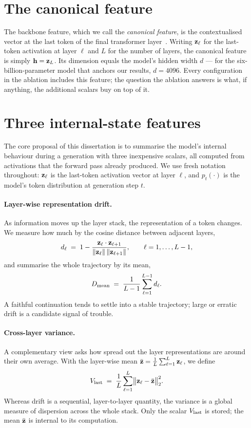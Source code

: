 \section{The canonical feature}

The backbone feature, which we call the \emph{canonical feature}, is the contextualised
vector at the last token of the final transformer layer~\cite{su2024mind}. Writing
$\mathbf{z}_\ell$ for the last-token activation at layer $\ell$ and $L$ for the number of
layers, the canonical feature is simply $\mathbf{h} = \mathbf{z}_L$. Its dimension equals the
model's hidden width $d$ --- for the six-billion-parameter model that anchors our results,
$d=4096$. Every configuration in the ablation includes this feature; the question the
ablation answers is what, if anything, the additional scalars buy on top of it.

\section{Three internal-state features}
\label{sec:trio}

The core proposal of this dissertation is to summarise the model's internal behaviour
during a generation with three inexpensive scalars, all computed from activations that
the forward pass already produced. We use fresh notation throughout: $\mathbf{z}_\ell$ is the
last-token activation vector at layer $\ell$, and $p_t(\cdot)$ is the model's token
distribution at generation step $t$.

\paragraph{Layer-wise representation drift.}
As information moves up the layer stack, the representation of a token changes. We measure
how much by the cosine distance between adjacent layers,
\begin{equation}
d_\ell \;=\; 1 - \frac{\mathbf{z}_\ell \cdot \mathbf{z}_{\ell+1}}{\lVert \mathbf{z}_\ell\rVert\,\lVert \mathbf{z}_{\ell+1}\rVert},
\qquad \ell = 1,\dots,L-1,
\end{equation}
and summarise the whole trajectory by its mean,
\begin{equation}
D_{\mathrm{mean}} \;=\; \frac{1}{L-1}\sum_{\ell=1}^{L-1} d_\ell .
\end{equation}
A faithful continuation tends to settle into a stable trajectory; large or erratic drift
is a candidate signal of trouble.

\paragraph{Cross-layer variance.}
A complementary view asks how spread out the layer representations are around their own
average. With the layer-wise mean $\bar{\mathbf{z}} = \tfrac{1}{L}\sum_{\ell=1}^{L}\mathbf{z}_\ell$,
we define
\begin{equation}
V_{\mathrm{last}} \;=\; \frac{1}{L}\sum_{\ell=1}^{L}\bigl\lVert \mathbf{z}_\ell - \bar{\mathbf{z}}\bigr\rVert_2^{2}.
\end{equation}
Whereas drift is a sequential, layer-to-layer quantity, the variance is a global measure
of dispersion across the whole stack. Only the scalar $V_{\mathrm{last}}$ is stored; the mean
$\bar{\mathbf{z}}$ is internal to its computation.

